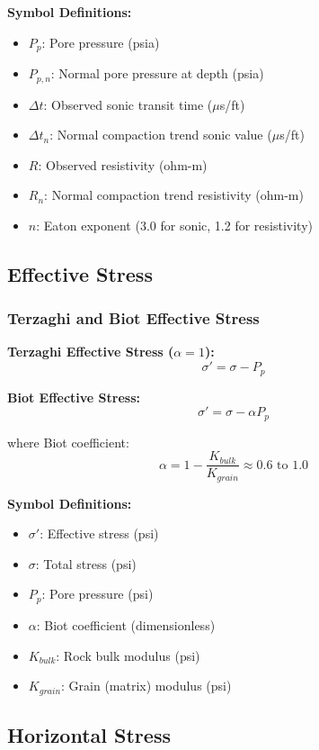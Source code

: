 \documentclass[11pt,a4paper]{article}
\newcommand{\symitem}[2]{\item \textbf{#1}: #2}
\begin{document}
\textbf{Symbol Definitions:}
\begin{itemize}[leftmargin=2cm]
\symitem{$P_p$}{Pore pressure (psia)}
\symitem{$P_{p,n}$}{Normal pore pressure at depth (psia)}
\symitem{$\Delta t$}{Observed sonic transit time ($\mu$s/ft)}
\symitem{$\Delta t_n$}{Normal compaction trend sonic value ($\mu$s/ft)}
\symitem{$R$}{Observed resistivity (ohm-m)}
\symitem{$R_n$}{Normal compaction trend resistivity (ohm-m)}
\symitem{$n$}{Eaton exponent (3.0 for sonic, 1.2 for resistivity)}
\end{itemize}

\subsection{Effective Stress}

\subsubsection{Terzaghi and Biot Effective Stress}

\begin{tcolorbox}[colback=formulabox,colframe=black!75]
\textbf{Terzaghi Effective Stress ($\alpha = 1$):}
\begin{equation}
\sigma' = \sigma - P_p
\end{equation}

\textbf{Biot Effective Stress:}
\begin{equation}
\sigma' = \sigma - \alpha P_p
\end{equation}

where Biot coefficient:
\begin{equation}
\alpha = 1 - \frac{K_{bulk}}{K_{grain}} \approx 0.6 \text{ to } 1.0
\end{equation}
\end{tcolorbox}

\textbf{Symbol Definitions:}
\begin{itemize}[leftmargin=2cm]
\symitem{$\sigma'$}{Effective stress (psi)}
\symitem{$\sigma$}{Total stress (psi)}
\symitem{$P_p$}{Pore pressure (psi)}
\symitem{$\alpha$}{Biot coefficient (dimensionless)}
\symitem{$K_{bulk}$}{Rock bulk modulus (psi)}
\symitem{$K_{grain}$}{Grain (matrix) modulus (psi)}
\end{itemize}

\subsection{Horizontal Stress}
\end{document}
